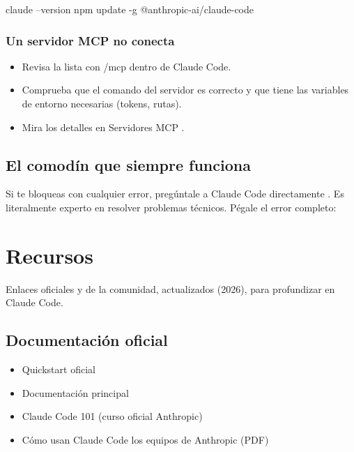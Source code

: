 \documentclass[11pt,a4paper]{book}
\begin{document}
\begin{codebox}
claude --version
npm update -g @anthropic-ai/claude-code
\end{codebox}
\subsection{Un servidor MCP no conecta}
\begin{itemize}\item Revisa la lista con /mcp dentro de Claude Code.\end{itemize}
\begin{itemize}\item Comprueba que el comando del servidor es correcto y que tiene las variables de entorno necesarias (tokens, rutas).\end{itemize}
\begin{itemize}\item Mira los detalles en Servidores MCP .\end{itemize}
\section{El comodín que siempre funciona}
Si te bloqueas con cualquier error, pregúntale a Claude Code directamente . Es literalmente experto en resolver problemas técnicos. Pégale el error completo:

\chapter{Recursos}
Enlaces oficiales y de la comunidad, actualizados (2026), para profundizar en Claude Code.

\section{Documentación oficial}
\begin{itemize}\item Quickstart oficial\end{itemize}
\begin{itemize}\item Documentación principal\end{itemize}
\begin{itemize}\item Claude Code 101 (curso oficial Anthropic)\end{itemize}
\begin{itemize}\item Cómo usan Claude Code los equipos de Anthropic (PDF)\end{itemize}
\end{document}
